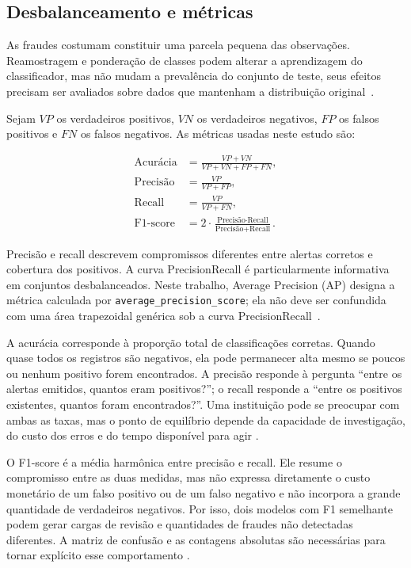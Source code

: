 \documentclass[11pt,a4paper]{article}
\begin{document}
\subsection{Desbalanceamento e métricas}

As fraudes costumam constituir uma parcela pequena das observações. Reamostragem e ponderação de classes podem alterar a aprendizagem do classificador, mas não mudam a prevalência do conjunto de teste, seus efeitos precisam ser avaliados sobre dados que mantenham a distribuição original~\cite{ribeiro2023estrategias,Mqadi_SMOTE}.

Sejam $VP$ os verdadeiros positivos, $VN$ os verdadeiros negativos, $FP$ os falsos positivos e $FN$ os falsos negativos. As métricas usadas neste estudo são:



\begin{align}
    \text{Acurácia} &= \frac{VP+VN}{VP+VN+FP+FN}, \\
    \text{Precisão} &= \frac{VP}{VP+FP}, \\
    \text{Recall} &= \frac{VP}{VP+FN}, \\
    \text{F1-score} &= 2\cdot\frac{\text{Precisão}\cdot\text{Recall}}
    {\text{Precisão}+\text{Recall}}.
\end{align}

Precisão e recall descrevem compromissos diferentes entre alertas corretos e cobertura dos positivos. A curva Precision\textendash{}Recall é particularmente informativa em conjuntos desbalanceados. Neste trabalho, Average Precision (AP) designa a métrica calculada por \texttt{average\_precision\_score}; ela não deve ser confundida com uma área trapezoidal genérica sob a curva Precision\textendash{}Recall~\cite{DavisGoadrich2006}.

A acurácia corresponde à proporção total de classificações corretas. Quando quase todos os registros são negativos, ela pode permanecer alta mesmo se poucos ou nenhum positivo forem encontrados. A precisão responde à pergunta “entre os alertas emitidos, quantos eram positivos?”; o recall responde a “entre os positivos existentes, quantos foram encontrados?”. Uma instituição pode se preocupar com ambas as taxas, mas o ponto de equilíbrio depende da capacidade de investigação, do custo dos erros e do tempo disponível para agir \cite{Geron2019}.

O F1-score é a média harmônica entre precisão e recall. Ele resume o compromisso entre as duas medidas, mas não expressa diretamente o custo monetário de um falso positivo ou de um falso negativo e não incorpora a grande quantidade de verdadeiros negativos. Por isso, dois modelos com F1 semelhante podem gerar cargas de revisão e quantidades de fraudes não detectadas diferentes. A matriz de confusão e as contagens absolutas são necessárias para tornar explícito esse comportamento \cite{Geron2019}.
\end{document}
